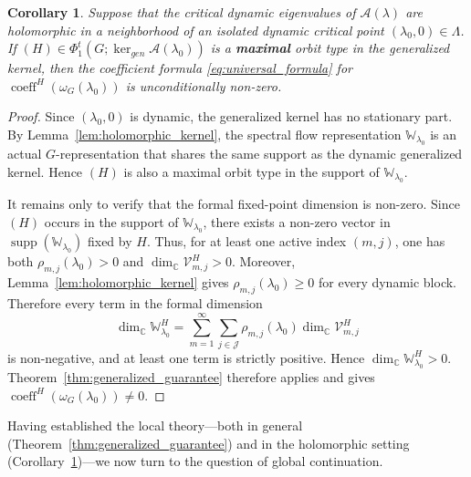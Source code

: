 \documentclass[twoside,11pt]{article}
\def\bc{{\mathbb{C}}}
\newtheorem{corollary}[theorem]{Corollary}
\begin{document}
\begin{corollary}\label{cor:holomorphic_universal_guarantee}
Suppose that the critical dynamic eigenvalues of $\mathscr{A}(\lambda)$ are
holomorphic in a neighborhood of an isolated dynamic critical point
$(\lambda_0,0)\in\Lambda$. If
$(H)\in \Phi_1^t(G;\ker_{gen}\mathscr A(\lambda_0))$ is a \textbf{maximal}
orbit type in the generalized kernel, then the coefficient formula
\eqref{eq:universal_formula} for
$\operatorname{coeff}^H(\omega_G(\lambda_0))$ is unconditionally non-zero.
\end{corollary}
\begin{proof}
Since $(\lambda_0,0)$ is dynamic, the generalized kernel has no stationary
part. By Lemma~\ref{lem:holomorphic_kernel}, the spectral flow representation
$\mathbb W_{\lambda_0}$ is an actual $G$-representation that shares the same support as the dynamic generalized kernel. Hence $(H)$ is also a maximal orbit type in the support of $\mathbb W_{\lambda_0}$.

It remains only to verify that the formal fixed-point dimension is non-zero.
Since $(H)$ occurs in the support of $\mathbb W_{\lambda_0}$, there exists a
non-zero vector in $\operatorname{supp}(\mathbb W_{\lambda_0})$ fixed by $H$.
Thus, for at least one active index $(m,j)$, one has both $\rho_{m,j}(\lambda_0)>0$ and $\dim_\bc \mathcal V_{m,j}^H>0$.
Moreover, Lemma~\ref{lem:holomorphic_kernel} gives
$\rho_{m,j}(\lambda_0)\geq 0$ for every dynamic block. Therefore every term in
the formal dimension
\[
\dim_\bc \mathbb W_{\lambda_0}^H
=
\sum_{m=1}^{\infty}\sum_{j\in\mathcal J}
\rho_{m,j}(\lambda_0)\dim_\bc\mathcal V_{m,j}^H
\]
is non-negative, and at least one term is strictly positive. Hence
$\dim_\bc \mathbb W_{\lambda_0}^H>0$. Theorem~\ref{thm:generalized_guarantee}
therefore applies and gives $\operatorname{coeff}^H(\omega_G(\lambda_0))\neq 0$.
\end{proof}
Having established the local theory---both in general (Theorem~\ref{thm:generalized_guarantee}) and in the holomorphic setting (Corollary~\ref{cor:holomorphic_universal_guarantee})---we now turn to the question of global continuation.
\end{document}
